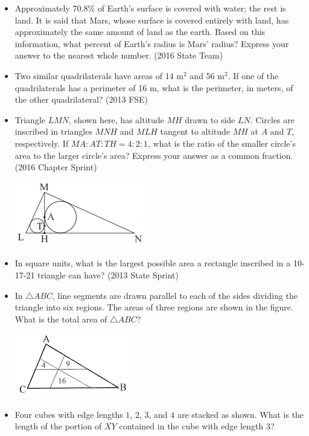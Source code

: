 \documentclass{article}
\begin{document}
\begin{itemize}

\item Approximately 70.8\% of Earth's surface is covered with water; the rest is land. It is said that Mars, whose surface is covered entirely with land, has approximately the same amount of land as the earth. Based on this information, what percent of Earth's radius is Mars' radius? Express your answer to the nearest whole number. (2016 State Team)

\item Two similar quadrilaterals have areas of 14 m$^2$ and 56 m$^2$. If one of the quadrilaterals has a perimeter of 16 m, what is the perimeter, in meters, of the other quadrilateral? (2013 FSE)

\item Triangle $LMN$, shown here, has altitude $MH$ drawn to side $LN$. Circles are inscribed in triangles $MNH$ and $MLH$ tangent to altitude $MH$ at $A$ and $T$, respectively. If $MA:AT:TH=4:2:1$, what is the ratio of the smaller circle's area to the larger circle's area? Express your answer as a common fraction. (2016 Chapter Sprint)

\centerline{\includegraphics{201628.png}}


\item In square units, what is the largest possible area a rectangle inscribed in a 10-17-21 triangle can have? (2013 State Sprint)

\item In $\triangle ABC$, line segments are drawn parallel to each of the sides dividing the triangle into six regions. The areas of three regions are shown in the figure. What is the total area of $\triangle ABC$? 

\centerline{\includegraphics{201314.png}}

\item Four cubes with edge lengths $1$, $2$, $3$, and $4$ are stacked as shown. What is the length of the portion of $\overline{XY}$ contained in the cube with edge length $3$?


\end{itemize}
\end{document}
